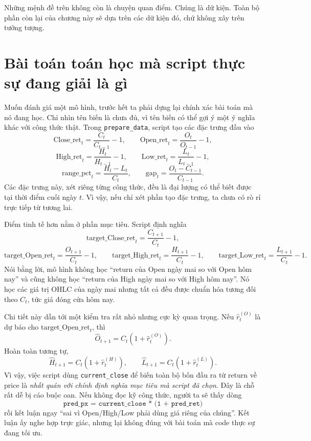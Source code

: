 Những mệnh đề trên không còn là chuyện quan điểm. Chúng là dữ kiện. Toàn bộ phần còn lại của chương này sẽ dựa trên các dữ kiện đó, chứ không xây trên tưởng tượng.

\section{Bài toán toán học mà script thực sự đang giải là gì}

Muốn đánh giá một mô hình, trước hết ta phải dựng lại chính xác bài toán mà nó đang học. Chỉ nhìn tên biến là chưa đủ, vì tên biến có thể gợi ý một ý nghĩa khác với công thức thật. Trong \texttt{prepare\_data}, script tạo các đặc trưng đầu vào
\[
\text{Close\_ret}_t=\frac{C_t}{C_{t-1}}-1,\qquad
\text{Open\_ret}_t=\frac{O_t}{O_{t-1}}-1,
\]
\[
\text{High\_ret}_t=\frac{H_t}{H_{t-1}}-1,\qquad
\text{Low\_ret}_t=\frac{L_t}{L_{t-1}}-1,
\]
\[
\text{range\_pct}_t=\frac{H_t-L_t}{C_t},
\qquad
\text{gap}_t=\frac{O_t-C_{t-1}}{C_{t-1}}.
\]
Các đặc trưng này, xét riêng từng công thức, đều là đại lượng có thể biết được tại thời điểm cuối ngày \(t\). Vì vậy, nếu chỉ xét phần tạo đặc trưng, ta chưa có rò rỉ trực tiếp từ tương lai.

Điểm tinh tế hơn nằm ở phần mục tiêu. Script định nghĩa
\[
\text{target\_Close\_ret}_t=\frac{C_{t+1}}{C_t}-1,
\]
\[
\text{target\_Open\_ret}_t=\frac{O_{t+1}}{C_t}-1,\qquad
\text{target\_High\_ret}_t=\frac{H_{t+1}}{C_t}-1,\qquad
\text{target\_Low\_ret}_t=\frac{L_{t+1}}{C_t}-1.
\]
Nói bằng lời, mô hình không học ``return của Open ngày mai so với Open hôm nay'' và cũng không học ``return của High ngày mai so với High hôm nay''. Nó học các giá trị OHLC của ngày mai nhưng tất cả đều được chuẩn hóa tương đối theo \(C_t\), tức giá đóng cửa hôm nay.

Chi tiết này dẫn tới một kiểm tra rất nhỏ nhưng cực kỳ quan trọng. Nếu \(\widehat r_t^{(O)}\) là dự báo cho \(\text{target\_Open\_ret}_t\), thì
\[
\widehat O_{t+1}=C_t(1+\widehat r_t^{(O)}).
\]
Hoàn toàn tương tự,
\[
\widehat H_{t+1}=C_t(1+\widehat r_t^{(H)}),
\qquad
\widehat L_{t+1}=C_t(1+\widehat r_t^{(L)}).
\]
Vì vậy, việc script dùng \texttt{current\_close} để biến toàn bộ bốn đầu ra từ return về price là \emph{nhất quán với chính định nghĩa mục tiêu mà script đã chọn}. Đây là chỗ rất dễ bị cáo buộc oan. Nếu không đọc kỹ công thức, người ta sẽ thấy dòng
\[
\texttt{pred\_px = current\_close * (1 + pred\_ret)}
\]
rồi kết luận ngay ``sai vì Open/High/Low phải dùng giá riêng của chúng''. Kết luận ấy nghe hợp trực giác, nhưng lại không đúng với bài toán mà code thực sự đang tối ưu.

